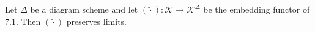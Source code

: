 Let $\Delta$ be a diagram scheme and let $(\tilde{\cdot}): \mathcal{K} \longrightarrow \mathcal{K}^{\Delta}$ be the embedding functor of 7.1. Then $(\tilde{\cdot})$ preserves limits.
